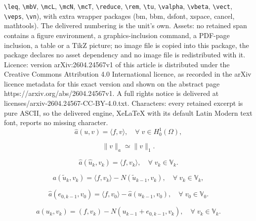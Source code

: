\documentclass[10pt,a4paper]{amsart}
\newcommand{\Hon}[1]{\|#1\|_1}
\newcommand{\anorm}[1]{\|#1\|_a}
\newcommand{\ha}{\hat{a}}
\newcommand{\hu}{\hat{u}}
\newcommand{\mbV}{\mathbb{V}}
\newcommand{\tu}{\tilde{u}}
\begin{document}
\texttt{\textbackslash leq}, \texttt{\textbackslash mbV}, \texttt{\textbackslash mcL}, \texttt{\textbackslash mcN}, \texttt{\textbackslash mcT}, \texttt{\textbackslash reduce}, \texttt{\textbackslash rem}, \texttt{\textbackslash tu}, \texttt{\textbackslash valpha}, \texttt{\textbackslash vbeta}, \texttt{\textbackslash vect}, \texttt{\textbackslash veps}, \texttt{\textbackslash vn}), with extra wrapper packages (bm, bbm, dsfont, xspace, cancel, mathtools). The delivered numbering is the unit's own. Assets: no retained span contains a figure environment, a graphics-inclusion command, a PDF-page inclusion, a table or a TikZ picture; no image file is copied into this package, the package declares no asset dependency and no image file is redistributed with it. Licence: version arXiv:2604.24567v1 of this article is distributed under the Creative Commons Attribution 4.0 International licence, as recorded in the arXiv licence metadata for this exact version and shown on the abstract page https://arxiv.org/abs/2604.24567v1. A full rights notice is delivered at licenses/arxiv-2604.24567-CC-BY-4.0.txt. Characters: every retained excerpt is pure ASCII, so the delivered engine, XeLaTeX with its default Latin Modern text font, reports no missing character.
\begin{equation}\label{model-VP}
	\ha(u,v) = \langle f , v \rangle, \quad \forall\; v \in H_0^1(\Omega), 
\end{equation}

\begin{equation}\label{equivalence-norm}
	 \anorm{v} \simeq \Hon{v}. 
\end{equation}

	\begin{equation}\label{solve-SAFEM}
		\ha(\hu_k,v_k) = \langle f,v_k \rangle, \quad \forall \; v_k \in \mbV_k. 
	\end{equation}

	\begin{equation}\label{solve-ATGFEM}
		a(\tu_k,v_k) = \langle f,v_k \rangle - N(\tu_{k-1},v_k), \quad \forall \; v_k \in \mbV_k, 
	\end{equation}

	\begin{equation}\label{mysolver-k-1}
		\ha(e_{0,k-1},v_0) = \langle f,v_0 \rangle - \ha(u_{k-1},v_0), \quad \forall \; v_0 \in \mbV_0.
	\end{equation}

	\begin{equation}\label{mysolver-k-2}
		a(u_k,v_k) = (f,v_k) - N(u_{k-1}+e_{0,k-1},v_k), \quad \forall\; v_k \in \mbV_k. 
	\end{equation}
\end{document}
